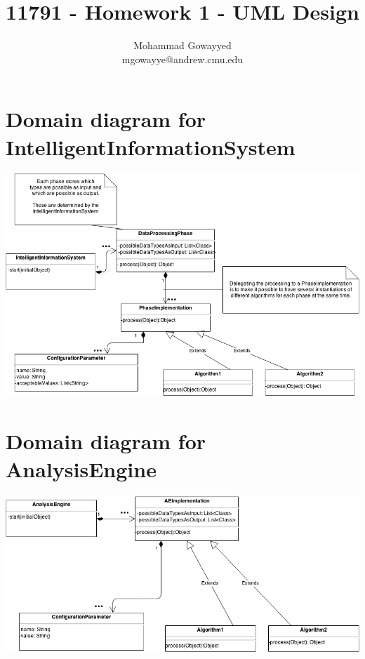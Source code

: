 \documentclass{article}
\begin{document}
\title{11791 - Homework 1 - UML Design}
\author{Mohammad Gowayyed \\ mgowayye@andrew.cmu.edu}

\maketitle

\section{Domain diagram for IntelligentInformationSystem}

\includegraphics[width=14cm]{uml1.png}


\section{Domain diagram for AnalysisEngine}

\includegraphics[width=14cm]{uml2.png}
\end{document}
